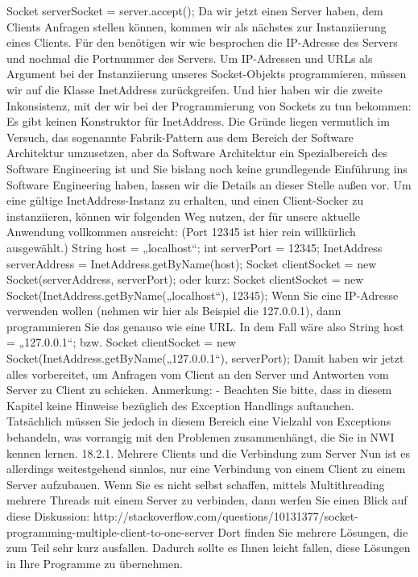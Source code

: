 Socket serverSocket = server.accept();
Da wir jetzt einen Server haben, dem Clients Anfragen stellen können, kommen wir als nächstes zur Instanziierung eines Clients. Für den benötigen wir wie besprochen die IP-Adresse des Servers und nochmal die Portnummer des Servers. Um IP-Adressen und URLs als Argument bei der Instanziierung unseres Socket-Objekts programmieren, müssen wir auf die Klasse InetAddress zurückgreifen. Und hier haben wir die zweite Inkonsistenz, mit der wir bei der Programmierung von Sockets zu tun bekommen: Es gibt keinen Konstruktor für InetAddress. Die Gründe liegen vermutlich im Versuch, das sogenannte Fabrik-Pattern aus dem Bereich der Software Architektur umzusetzen, aber da Software Architektur ein Spezialbereich des Software Engineering ist und Sie bislang noch keine grundlegende Einführung ins Software Engineering haben, lassen wir die Details an dieser Stelle außen vor.
Um eine gültige InetAddress-Instanz zu erhalten, und einen Client-Socker zu instanziieren, können wir folgenden Weg nutzen, der für unsere aktuelle Anwendung vollkommen ausreicht: (Port 12345 ist hier rein willkürlich ausgewählt.)
String host = „localhost“;
int serverPort = 12345;
InetAddress serverAddress = InetAddress.getByName(host);
Socket clientSocket = new Socket(serverAddress, serverPort);
oder kurz:
Socket clientSocket = new Socket(InetAddress.getByName(„localhost“), 12345);
Wenn Sie eine IP-Adresse verwenden wollen (nehmen wir hier als Beispiel die 127.0.0.1), dann programmieren Sie das genauso wie eine URL. In dem Fall wäre also String host = „127.0.0.1“; bzw.
Socket clientSocket = new Socket(InetAddress.getByName(„127.0.0.1“), serverPort);
Damit haben wir jetzt alles vorbereitet, um Anfragen vom Client an den Server und Antworten vom Server zu Client zu schicken.
Anmerkung:
-	Beachten Sie bitte, dass in diesem Kapitel keine Hinweise bezüglich des Exception Handlings auftauchen. Tatsächlich müssen Sie jedoch in diesem Bereich eine Vielzahl von Exceptions behandeln, was vorrangig mit den Problemen zusammenhängt, die Sie in NWI kennen lernen.
18.2.1.	Mehrere Clients und die Verbindung zum Server
Nun ist es allerdings weitestgehend sinnlos, nur eine Verbindung von einem Client zu einem Server aufzubauen. Wenn Sie es nicht selbst schaffen, mittels Multithreading mehrere Threads mit einem Server zu verbinden, dann werfen Sie einen Blick auf diese Diskussion: http://stackoverflow.com/questions/10131377/socket-programming-multiple-client-to-one-server Dort finden Sie mehrere Lösungen, die zum Teil sehr kurz ausfallen. Dadurch sollte es Ihnen leicht fallen, diese Lösungen in Ihre Programme zu übernehmen.
